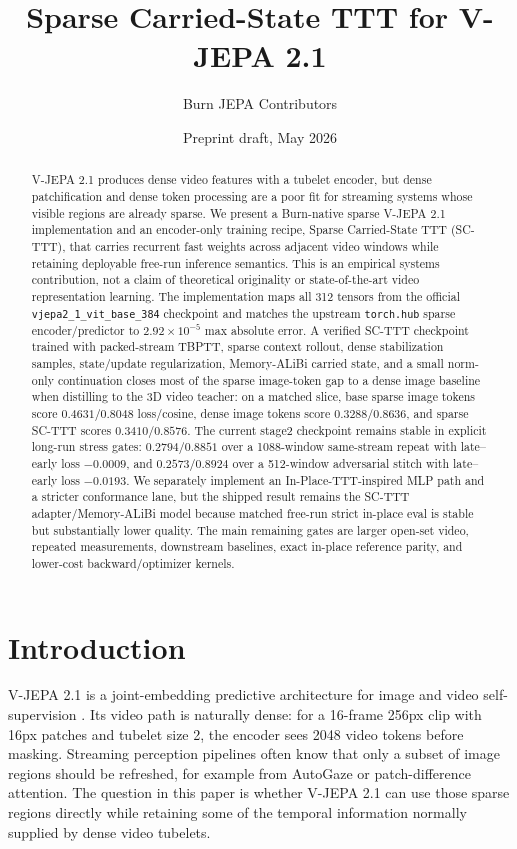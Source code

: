 \documentclass[10pt]{article}
\title{Sparse Carried-State TTT for V-JEPA 2.1}
\author{Burn JEPA Contributors}
\date{Preprint draft, May 2026}
\begin{document}
\maketitle

\begin{abstract}
V-JEPA 2.1 produces dense video features with a tubelet encoder, but dense
patchification and dense token processing are a poor fit for streaming systems
whose visible regions are already sparse.  We present a Burn-native sparse
V-JEPA 2.1 implementation and an encoder-only training recipe, Sparse
Carried-State TTT (SC-TTT), that carries recurrent fast weights across adjacent
video windows while retaining deployable free-run inference semantics.  This is
an empirical systems contribution, not a claim of theoretical originality or
state-of-the-art video representation learning.  The implementation maps all
312 tensors from the official \texttt{vjepa2\_1\_vit\_base\_384} checkpoint and
matches the upstream \texttt{torch.hub} sparse encoder/predictor to
$2.92\times 10^{-5}$ max absolute error.  A verified SC-TTT checkpoint trained
with packed-stream TBPTT, sparse context rollout, dense stabilization samples,
state/update regularization, Memory-ALiBi carried state, and a small
norm-only continuation closes most of the sparse image-token gap to a dense
image baseline when distilling to the 3D video teacher: on a matched slice,
base sparse image tokens score $0.4631/0.8048$ loss/cosine, dense image tokens
score $0.3288/0.8636$, and sparse SC-TTT scores $0.3410/0.8576$.  The current
stage2 checkpoint remains stable in explicit long-run stress gates:
$0.2794/0.8851$ over a 1088-window same-stream repeat with late--early loss
$-0.0009$, and $0.2573/0.8924$ over a 512-window adversarial stitch with
late--early loss $-0.0193$.  We separately implement an
In-Place-TTT-inspired MLP path and a stricter conformance lane, but the shipped
result remains the SC-TTT adapter/Memory-ALiBi model because matched free-run
strict in-place eval is stable but substantially lower quality.  The main
remaining gates are larger open-set video, repeated measurements, downstream
baselines, exact in-place reference parity, and lower-cost backward/optimizer
kernels.
\end{abstract}

\section{Introduction}

V-JEPA 2.1 is a joint-embedding predictive architecture for image and video
self-supervision \cite{mur2026vjepa21}.  Its video path is naturally dense: for
a 16-frame 256px clip with 16px patches and tubelet size 2, the encoder sees
2048 video tokens before masking.  Streaming perception pipelines often know
that only a subset of image regions should be refreshed, for example from
AutoGaze or patch-difference attention.  The question in this paper is whether
V-JEPA 2.1 can use those sparse regions directly while retaining some of the
temporal information normally supplied by dense video tubelets.
\end{document}
